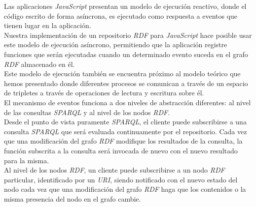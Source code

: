 Las aplicaciones \textit{JavaScript} presentan un modelo de ejecuci\'on reactivo, donde el c\'odigo escrito de forma as\'incrona, es ejecutado como respuesta a eventos que tienen lugar en la aplicaci\'on.\\
Nuestra implementaci\'on de un repositorio \textit{RDF} para \textit{JavaScript} hace posible usar este modelo de ejecuci\'on as\'incrono, permitiendo que la aplicaci\'on registre funciones que ser\'an ejecutadas cuando un determinado evento suceda en el grafo \textit{RDF} almacenado en \'el.\\
Este modelo de ejecuci\'on tambi\'en se encuentra pr\'oximo al modelo te\'orico que hemos presentado donde diferentes procesos se comunican a trav\'es de un espacio de tripletes a trav\'es de operaciones de lectura y escritura sobre \'el.\\
El mecanismo de eventos funciona a dos niveles de abstracci\'on diferentes: al nivel de las consultas \textit{SPARQL} y al nivel de los nodos \textit{RDF}.\\
Desde el punto de vista puramente \textit{SPARQL}, el cliente puede subscribirse a una consulta \textit{SPARQL} que ser\'a evaluada continuamente por el repositorio. Cada vez que una modificaci\'on del grafo \textit{RDF} modifique los resultados de la consulta, la funci\'on subscrita a la consulta ser\'a invocada de nuevo con el nuevo resultado para la misma.\\
Al nivel de los nodos \textit{RDF}, un cliente puede subscribirse a un nodo \textit{RDF} particular, identificado por un \textit{URI}, siendo notificado con el nuevo estado del nodo cada vez que una modificaci\'on del grafo \textit{RDF} haga que los contenidos o la misma presencia del nodo en el grafo cambie.